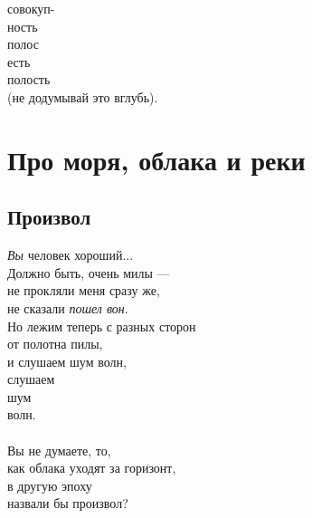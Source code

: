 \documentclass[12pt,a5paper]{report}
\newcommand{\textoverline}[1]{$\overline{\mbox{#1}}$}
\begin{document}
совокуп- \\
ность \\

полос \\

есть \\

полость \\

(не додумывай это вглубь).


\section{Про моря, облака и реки}
\subsection{Произвол}
\emph{Вы} человек хороший...\\

Должно быть, очень милы ---\\ 
не прокляли меня сразу же,\\
не сказали \emph{пошел вон}.\\ 

Но лежим теперь с разных сторон\\ 
от полотна пилы,\\ 
и слушаем шум волн,\\
слушаем\\
\phantom{слушаем} шум\\
\phantom{слушаем шум} волн.\\ 
\\
Вы не думаете, то,\\
как облака уходят за \textoverline{горизонт},\\ 
в другую эпоху\\
назвали бы произвол?\\
\newpage
\end{document}
